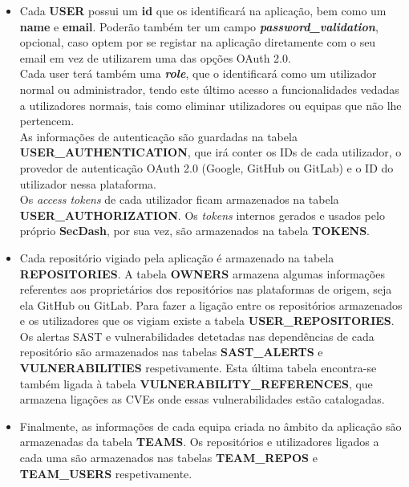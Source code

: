 \begin{itemize}
	\item Cada \textbf{USER} possui um \textbf{id} que os identificará na aplicação, bem como um \textbf{name} e \textbf{email}. Poderão também ter um campo \textit{\textbf{password\_validation}}, opcional, caso optem por se registar na aplicação diretamente com o seu email em vez de utilizarem uma das opções OAuth 2.0. \\
	
	Cada user terá também uma \textit{\textbf{role}}, que o identificará como um utilizador normal ou administrador, tendo este último acesso a funcionalidades vedadas a utilizadores normais, tais como eliminar utilizadores ou equipas que não lhe pertencem. \\
	
	As informações de autenticação são guardadas na tabela \textbf{USER\_AUTHENTICATION}, que irá conter os IDs de cada utilizador, o provedor de autenticação OAuth 2.0  (Google, GitHub ou GitLab) e o ID do utilizador nessa plataforma. \\
	
	Os \textit{access tokens} de cada utilizador ficam armazenados na tabela \textbf{USER\_AUTHORIZATION}. Os \textit{tokens} internos gerados e usados pelo próprio \textbf{SecDash}, por sua vez, são armazenados na tabela \textbf{TOKENS}. \\
	
	\item Cada repositório vigiado pela aplicação é armazenado na tabela \textbf{REPOSITORIES}. A tabela \textbf{OWNERS} armazena algumas informações referentes aos proprietários dos repositórios nas plataformas de origem, seja ela GitHub ou GitLab. Para fazer a ligação entre os repositórios armazenados e os utilizadores que os vigiam existe a tabela \textbf{USER\_REPOSITORIES}. \\ 
	
	Os alertas SAST e vulnerabilidades detetadas nas dependências de cada repositório são armazenados nas tabelas \textbf{SAST\_ALERTS} e \textbf{VULNERABILITIES} respetivamente. Esta última tabela encontra-se também ligada à tabela \textbf{VULNERABILITY\_REFERENCES}, que armazena ligações as CVEs onde essas vulnerabilidades estão catalogadas. \\
	
	\item Finalmente, as informações de cada equipa criada no âmbito da aplicação são armazenadas da tabela \textbf{TEAMS}. Os repositórios e utilizadores ligados a cada uma são armazenados nas tabelas \textbf{TEAM\_REPOS} e \textbf{TEAM\_USERS} respetivamente. \\
\end{itemize}

